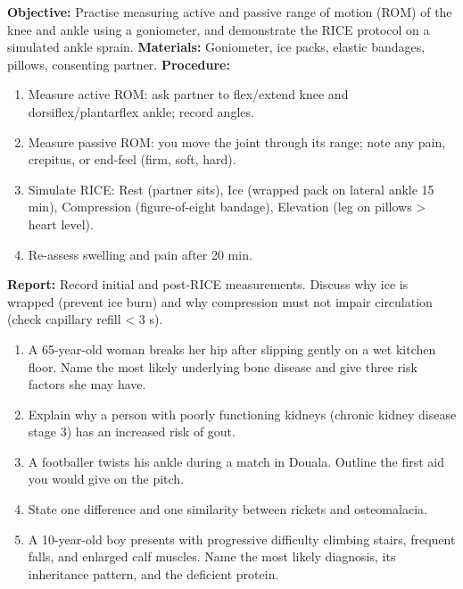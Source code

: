 \documentclass[11pt]{article}
\begin{document}
\begin{experience}
\textbf{Objective:} Practise measuring active and passive range of motion (ROM) of the knee and ankle using a goniometer, and demonstrate the RICE protocol on a simulated ankle sprain.
\textbf{Materials:} Goniometer, ice packs, elastic bandages, pillows, consenting partner.
\textbf{Procedure:}
\begin{enumerate}
\item Measure active ROM: ask partner to flex/extend knee and dorsiflex/plantarflex ankle; record angles.
\item Measure passive ROM: you move the joint through its range; note any pain, crepitus, or end-feel (firm, soft, hard).
\item Simulate RICE: Rest (partner sits), Ice (wrapped pack on lateral ankle 15 min), Compression (figure-of-eight bandage), Elevation (leg on pillows > heart level).
\item Re-assess swelling and pain after 20 min.
\end{enumerate}
\textbf{Report:} Record initial and post-RICE measurements. Discuss why ice is wrapped (prevent ice burn) and why compression must not impair circulation (check capillary refill < 3 s).
\end{experience}

\begin{exercice}
\begin{enumerate}
\item A 65-year-old woman breaks her hip after slipping gently on a wet kitchen floor. Name the most likely underlying bone disease and give three risk factors she may have.
\item Explain why a person with poorly functioning kidneys (chronic kidney disease stage 3) has an increased risk of gout.
\item A footballer twists his ankle during a match in Douala. Outline the first aid you would give on the pitch.
\item State one difference and one similarity between rickets and osteomalacia.
\item A 10-year-old boy presents with progressive difficulty climbing stairs, frequent falls, and enlarged calf muscles. Name the most likely diagnosis, its inheritance pattern, and the deficient protein.
\end{enumerate}
\end{exercice}
\end{document}
